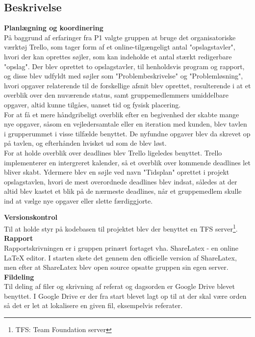 \subsection{Beskrivelse}

\textbf{Planlægning og koordinering}\\ %
På baggrund af erfaringer fra P1 valgte gruppen at bruge det organisatoriske værktøj Trello, som tager form af et online-tilgængeligt antal "opslagstavler", hvori der kan oprettes søjler, som kan indeholde et antal stærkt redigerbare "opslag". Der blev oprettet to opslagstavler, til henholdsvis program og rapport, og disse blev udfyldt med søjler som "Problembeskrivelse" og "Problemløsning", hvori opgaver relaterende til de forskellige afsnit blev oprettet, resulterende i at et overblik over den nuværende status, samt gruppemedlemmers umiddelbare opgaver, altid kunne tilgåes, uanset tid og fysisk placering.\\
For at få et mere håndgribeligt overblik efter en begivenhed der skabte mange nye opgaver, såsom en vejledersamtale eller en iteration med kunden, blev tavlen i grupperummet i visse tilfælde benyttet. De nyfundne opgaver blev da skrevet op på tavlen, og efterhånden hvisket ud som de blev løst.\\
For at holde overblik over deadlines blev Trello ligeledes benyttet. Trello implementerer en intergreret kalender, så et overblik over kommende deadlines let bliver skabt. Ydermere blev en søjle ved navn "Tidsplan" oprettet i projekt opslagstavlen, hvori de mest overordnede deadlines blev indsat, således at der altid blev kastet et blik på de nærmeste deadlines, når et gruppemedlem skulle ind at vælge nye opgaver eller slette færdiggjorte.


\textbf{Versionskontrol}\\ %
Til at holde styr på kodebasen til projektet blev der benyttet en TFS server\footnote{TFS: Team Foundation server}.\\

\textbf{Rapport}\\ %
Rapportskrivningen er i gruppen prinært fortaget vha. ShareLatex - en online LaTeX editor. I starten skete det gennem den officielle version af ShareLatex, men efter at ShareLatex blev open source opsatte gruppen sin egen server.\\

\textbf{Fildeling}\\ %
Til deling af filer og skrivning af referat og dagsorden er Google Drive blevet benyttet. I Google Drive er der fra start blevet lagt op til at der skal være orden så det er let at lokalisere en given fil, eksempelvis referater.
